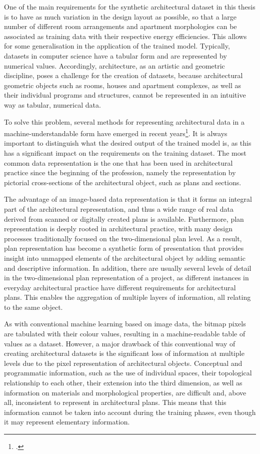 \documentclass[a4paper, 12pt]{report}
\begin{document}
One of the main requirements for the synthetic architectural dataset in this thesis is to have as much variation in the design layout as possible, so that a large number of different room arrangements and apartment morphologies can be associated as training data with their respective energy efficiencies. This allows for some generalisation in the application of the trained model. Typically, datasets in computer science have a tabular form and are represented by numerical values. Accordingly, architecture, as an artistic and geometric discipline, poses a challenge for the creation of datasets, because architectural geometric objects such as rooms, houses and apartment complexes, as well as their individual programs and structures, cannot be represented in an intuitive way as tabular, numerical data.

To solve this problem, several methods for representing architectural data in a machine-understandable form have emerged in recent years\footcite{kalervo2019cubicasa5k}. It is always important to distinguish what the desired output of the trained model is, as this has a significant impact on the requirements on the training dataset. The most common data representation is the one that has been used in architectural practice since the beginning of the profession, namely the representation by pictorial cross-sections of the architectural object, such as plans and sections.

The advantage of an image-based data representation is that it forms an integral part of the architectural representation, and thus a wide range of real data derived from scanned or digitally created plans is available. Furthermore, plan representation is deeply rooted in architectural practice, with many design processes traditionally focused on the two-dimensional plan level. As a result, plan representation has become a synthetic form of presentation that provides insight into unmapped elements of the architectural object by adding semantic and descriptive information. In addition, there are usually several levels of detail in the two-dimensional plan representation of a project, as different instances in everyday architectural practice have different requirements for architectural plans. This enables the aggregation of multiple layers of information, all relating to the same object.

As with conventional machine learning based on image data, the bitmap pixels are tabulated with their colour values, resulting in a machine-readable table of values as a dataset. However, a major drawback of this conventional way of creating architectural datasets is the significant loss of information at multiple levels due to the pixel representation of architectural objects. Conceptual and programmatic information, such as the use of individual spaces, their topological relationship to each other, their extension into the third dimension, as well as information on materials and morphological properties, are difficult and, above all, inconsistent to represent in architectural plans. This means that this information cannot be taken into account during the training phases, even though it may represent elementary information.
\end{document}
